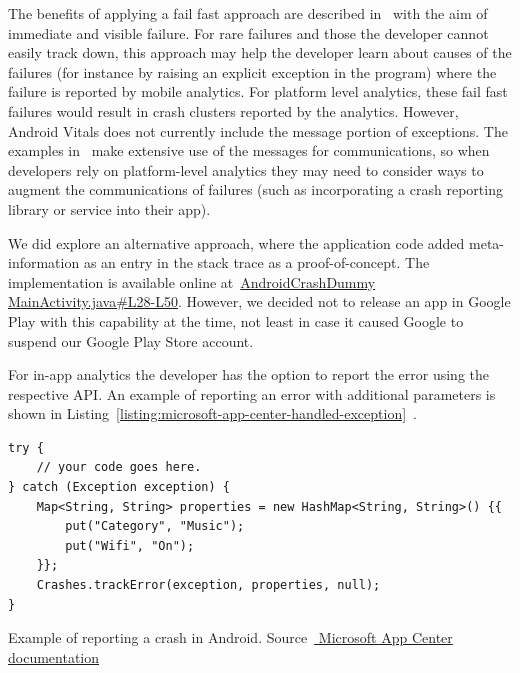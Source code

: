 The benefits of applying a fail fast approach are described in~ with the aim of immediate and visible failure. For rare failures and those the developer cannot easily track down, this approach may help the developer learn about causes of the failures (for instance by raising an explicit exception in the program) where the failure is reported by mobile analytics. For platform level analytics, these fail fast failures would result in crash clusters reported by the analytics. However, Android Vitals does not currently include the message portion of exceptions. The examples in~ make extensive use of the messages for communications, so when developers rely on platform-level analytics they may need to consider ways to augment the communications of failures (such as incorporating a crash reporting library or service into their app).


\begin{kaobox}[frametitle=An alternative approach]
We did explore an alternative approach, where the application code added meta-information as an entry in the stack trace as a proof-of-concept. 
The implementation is available online at~\href{https://github.com/ISNIT0/AndroidCrashDummy/blob/cfa7f0817c436d7e657741e0a5d9a76644e5a898/app/src/main/java/com/example/user/androidtestapp/MainActivity.java\#L28-L50}{AndroidCrashDummy MainActivity.java\#L28-L50}.  However, we decided not to release an app in Google Play with this capability at the time, not least in case it caused Google to suspend our Google Play Store account. 
\end{kaobox}

For in-app analytics the developer has the option to report the error using the respective API. An example of reporting an error with additional parameters is shown in Listing~\ref{listing:microsoft-app-center-handled-exception}~.

\begin{listing}
\begin{verbatim}
try {
    // your code goes here.
} catch (Exception exception) {
    Map<String, String> properties = new HashMap<String, String>() {{
        put("Category", "Music");
        put("Wifi", "On");
    }};
    Crashes.trackError(exception, properties, null);
}
\end{verbatim}
\caption[Microsoft AppCenter: example of reporting a crash in Android]{Example of reporting a crash in Android.  Source~\href{https://docs.microsoft.com/en-us/appcenter/sdk/crashes/android}{ Microsoft App Center documentation}}
\label{listing:microsoft-app-center-handled-exception}
\end{listing}


